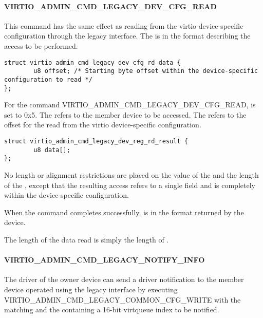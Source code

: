 \paragraph{VIRTIO_ADMIN_CMD_LEGACY_DEV_CFG_READ}
\label{par:Basic Facilities of a Virtio Device / Device groups / Group administration commands / Legacy Interface / VIRTIO_ADMIN_CMD_LEGACY_DEV_CFG_READ}

This command has the same effect as reading from the virtio device-specific
configuration through the legacy interface. The  is in
the format  describing
the access to be performed.

\begin{lstlisting}
struct virtio_admin_cmd_legacy_dev_cfg_rd_data {
        u8 offset; /* Starting byte offset within the device-specific configuration to read */
};
\end{lstlisting}

For the command VIRTIO_ADMIN_CMD_LEGACY_DEV_CFG_READ, 
is set to 0x5.
The  refers to the member device to be accessed.
The  refers to the offset for the read from the virtio device-specific
configuration.

\begin{lstlisting}
struct virtio_admin_cmd_legacy_dev_reg_rd_result {
        u8 data[];
};
\end{lstlisting}

No length or alignment restrictions are placed on the value of the
 and the length of the , except that the resulting
access refers to a single field and is completely within the device-specific
configuration.

When the command completes successfully,  is in
the format 
returned by the device.

The length of the data read is simply the length of .

\paragraph{VIRTIO_ADMIN_CMD_LEGACY_NOTIFY_INFO}
\label{par:Basic Facilities of a Virtio Device / Device groups / Group administration commands / Legacy Interface / VIRTIO_ADMIN_CMD_LEGACY_NOTIFY_INFO}

The driver of the owner device can send a driver notification to the member
device operated using the legacy interface by executing
VIRTIO_ADMIN_CMD_LEGACY_COMMON_CFG_WRITE with the  matching
 and the  containing a 16-bit virtqueue index to
be notified.

